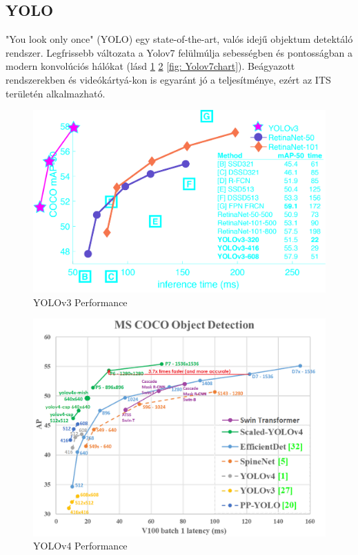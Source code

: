 \documentclass[acmtog, authorversion]{acmart}
\begin{document}
\subsection{YOLO}
"You look only once" (YOLO) egy state-of-the-art, valós idejű objektum detektáló rendszer. Legfrissebb változata a Yolov7 felülmúlja sebességben
és pontosságban a modern konvolúciós hálókat (lásd \ref{fig: Yolov3chart} \ref{fig: Yolov4chart} \ref{fig: Yolov7chart}). Beágyazott rendszerekben és videókártyá-kon is egyaránt jó a teljesítménye, ezért az ITS területén
alkalmazható. 
\begin{figure}[H]
 \includegraphics[width=1\columnwidth]{yolov3_perf.png}
 \caption{YOLOv3 Performance}
 \label{fig: Yolov3chart}
\end{figure}
\begin{figure}[H]
 \includegraphics[width=1\columnwidth]{yolov4_perf.png}
 \caption{YOLOv4 Performance}
 \label{fig: Yolov4chart}
\end{figure}
\end{document}
